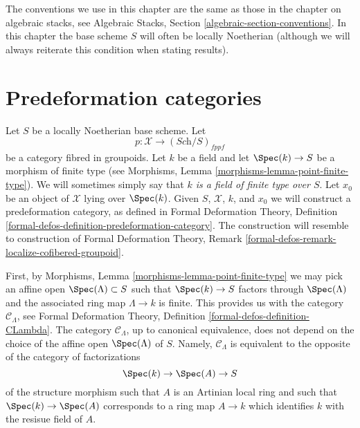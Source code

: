 \noindent
The conventions we use in this chapter are the same as those in the
chapter on algebraic stacks, see
Algebraic Stacks, Section \ref{algebraic-section-conventions}.
In this chapter the base scheme $S$ will often be locally Noetherian
(although we will always reiterate this condition when stating
results).





\section{Predeformation categories}
\label{section-predeformation-categories}

\noindent
Let $S$ be a locally Noetherian base scheme. Let
$$
p : \mathcal{X} \longrightarrow (\textit{Sch}/S)_{fppf}
$$
be a category fibred in groupoids. Let $k$ be a field
and let $\Spec(k) \to S$ be a morphism of finite type (see
Morphisms, Lemma \ref{morphisms-lemma-point-finite-type}). We will sometimes
simply say that {\it $k$ is a field of finite type over $S$}. Let
$x_0$ be an object of $\mathcal{X}$ lying over $\Spec(k)$.
Given $S$, $\mathcal{X}$, $k$, and $x_0$ we will construct a
predeformation category, as defined in 
Formal Deformation Theory,
Definition \ref{formal-defos-definition-predeformation-category}.
The construction will resemble to construction of
Formal Deformation Theory,
Remark \ref{formal-defos-remark-localize-cofibered-groupoid}.

\medskip\noindent
First, by Morphisms, Lemma \ref{morphisms-lemma-point-finite-type}
we may pick an affine open $\Spec(\Lambda) \subset S$ such that
$\Spec(k) \to S$ factors through $\Spec(\Lambda)$ and the associated
ring map $\Lambda \to k$ is finite. This provides us with the category
$\mathcal{C}_\Lambda$, see
Formal Deformation Theory, Definition \ref{formal-defos-definition-CLambda}.
The category $\mathcal{C}_\Lambda$, up to canonical equivalence,
does not depend on the choice of the affine open $\Spec(\Lambda)$ of $S$.
Namely, $\mathcal{C}_\Lambda$ is equivalent to the opposite
of the category of factorizations
\begin{equation}
\label{equation-factor}
\Spec(k) \to \Spec(A) \to S
\end{equation}
of the structure morphism such that $A$ is an Artinian local ring and
such that $\Spec(k) \to \Spec(A)$ corresponds to a ring map $A \to k$ which
identifies $k$ with the resisue field of $A$.

